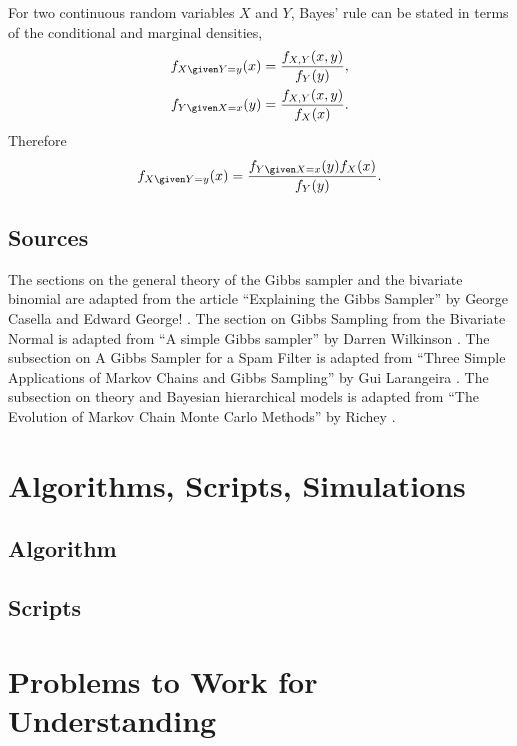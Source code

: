 \documentclass[12pt]{article}
\begin{document}
For two continuous random variables \( X \) and \( Y \), Bayes' rule can
be stated in terms of the conditional and marginal densities,
\begin{align*}
    f_{X \given Y = y}(x) &= \frac{f_{X,Y}(x,y)}{f_Y(y)}, \\
    f_{Y \given X = x}(y) &= \frac{f_{X,Y}(x,y)}{f_X(x)}.
\end{align*}
Therefore
\[
    f_{X \given Y=y}(x) = \frac{f_{Y \given X = x}(y) f_X(x)}{f_Y(y)}.
\]

\subsection*{Sources} The sections on the general theory of the Gibbs
sampler and the bivariate binomial are adapted from the article
``Explaining the Gibbs Sampler'' by George Casella and Edward George!
\cite{casella92}.  The section on Gibbs Sampling from the Bivariate
Normal is adapted from ``A simple Gibbs sampler'' by Darren Wilkinson
\cite{wilkinson}.  The subsection on A Gibbs Sampler for a Spam Filter
is adapted from ``Three Simple Applications of Markov Chains and Gibbs
Sampling'' by Gui Larangeira
\cite{larangeira}.  The subsection on theory and Bayesian hierarchical
models is adapted from ``The Evolution of Markov Chain Monte Carlo
Methods'' by Richey
\cite{richey10}.

\hr

\section*{Algorithms, Scripts, Simulations}

\subsection*{Algorithm}

\subsection*{Scripts}



\hr

\section*{Problems to Work for Understanding}
\end{document}
